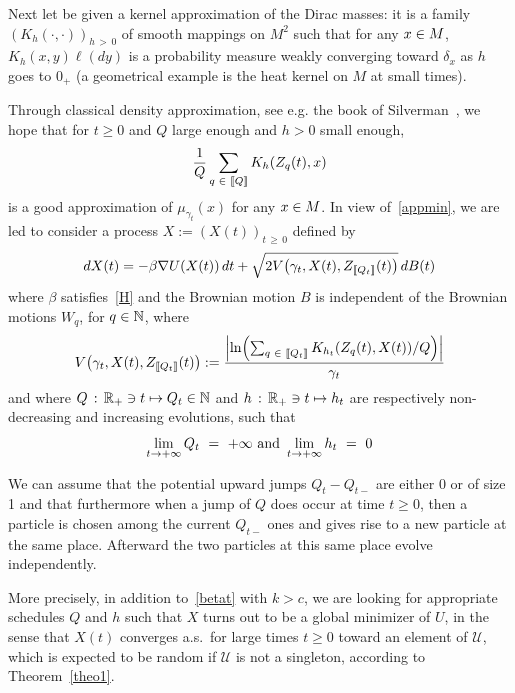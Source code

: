 \documentclass[AHL,Unicode,longabstracts,published]{cedram}
\newcommand{\f}[2]{\frac{#1}{#2}}
\newcommand{\cU}{\mathcal{U}}
\newcommand{\NN}{\mathbb{N}}
\newcommand{\RR}{\mathbb{R}}
\newcommand{\iy}{\infty}
\newcommand{\na}{\nabla}
\let\originalleft\left
\let\originalright\right
\renewcommand{\left}{\mathopen{}\mathclose\bgroup\originalleft}
\renewcommand{\right}{\aftergroup\egroup\originalright}
\let\oldin\in
\renewcommand{\in}{\mathchoice{\oldin}{\oldin}{\,\oldin\,}{\,\oldin\,}}
\renewcommand*{\to}{\mathchoice{\longrightarrow}{\rightarrow}{\rightarrow}{\rightarrow}}
\let\oldmapsto\mapsto
\renewcommand*{\mapsto}{\mathchoice{\longmapsto}{\oldmapsto}{\oldmapsto}{\oldmapsto}}
\newcommand{\llbracket}{\mathopen{[\mkern -2.7mu[}}
\newcommand{\rrbracket}{\mathclose{]\mkern -2.7mu]}}
\newcommand{\lin}{\llbracket}
\newcommand{\rin}{\rrbracket}
\begin{document}
Next let be given a kernel approximation of the Dirac masses: it is a family $(K_h(\cdot,\cdot))_{h\,>\,0}$ of smooth mappings on $M^2$ such that for any $x\in M$, $K_h(x,y)\ell(dy)$ is a probability measure weakly converging toward $\delta_x$ as $h$ goes to $0_+$ (a geometrical example is the heat kernel on $M$ at small times).


Through classical density approximation, see e.g. the book of Silverman~\cite{zbMATH04001209}, we hope that for $t\geq 0$ and $Q$ large enough and $h>0$ small enough,
\begin{equation*}
\f1Q\sum_{q\in\lin Q\rin} K_{h}(Z_q(t),x)
\end{equation*}
is a good approximation of $\mu_{\gamma_t}(x)$ for any $x\in M$. In view of~\eqref{appmin}, we are led to consider a process $X:= (X(t))_{t\,\geq\,0}$ defined by
\begin{equation*}
dX(t) = -\beta\na U(X(t))\, dt +\sqrt{2 V\left(\gamma_t,X(t),Z_{\lin Q_t\rin}(t)\right)}\, dB(t)
\end{equation*}
where $\beta$ satisfies~\eqref{H} and the Brownian motion $B$ is independent of the Brownian motions $W_q$, for $q\in\NN$, where
\begin{equation*}
V\left(\gamma_t,X(t),Z_{\lin Q_t\rin}(t)\right) := \f{\left| \ln\left(\sum_{q\in\lin Q_t\rin} K_{h_t}(Z_q(t),X(t))/Q\right)\right|}{\gamma_t}
\end{equation*}
and where $Q\,:\, \RR_+\ni t\mapsto Q_t\in \NN$ and $h\,:\, \RR_+\ni t\mapsto h_t$ are respectively non-decreasing and increasing evolutions, such that
\begin{equation*}
\lim_{t\to +\iy} Q_t\ =\ +\iy \text{ and } \lim_{t\to +\iy} h_t\ =\ 0
\end{equation*}


We can assume that the potential upward jumps $Q_t-Q_{t-}$ are either 0 or of size 1 and that furthermore when a jump of $Q$ does occur at time $t\geq 0$, then a particle is chosen among the current $Q_{t-}$ ones and gives rise to a new particle at the same place. Afterward the two particles at this same place evolve independently.

More precisely, in addition to~\eqref{betat} with $k>c$, we are looking for appropriate schedules $Q$ and $h$ such that $X$ turns out to be a global minimizer of $U$, in the sense that $X(t)$ converges a.s.\ for large times $t\geq 0$ toward an element of $\cU$, which is expected to be random if $\cU$ is not a singleton, according to Theorem~\ref{theo1}.




\end{document}
